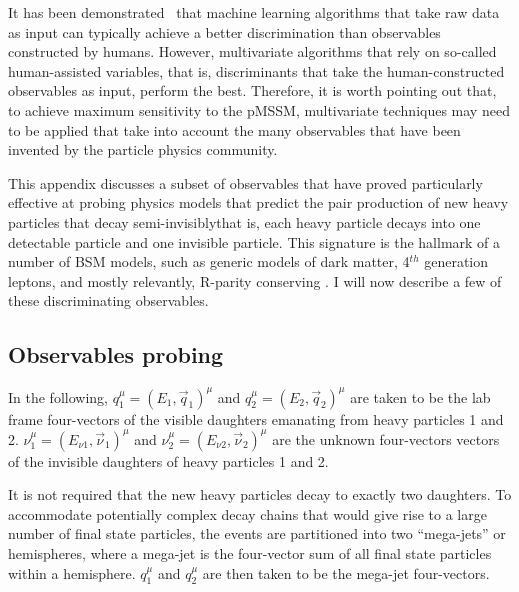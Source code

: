 It has been demonstrated~\cite{bishop2012pattern} that machine learning algorithms that take raw data as input can typically achieve a better discrimination than observables constructed by humans. However, multivariate algorithms that rely on so-called human-assisted variables, that is, discriminants that take the human-constructed observables as input, perform the best. Therefore, it is worth pointing out that, to achieve maximum sensitivity to the pMSSM, multivariate techniques may need to be applied that take into account the many observables that have been invented by the particle physics community. 

This appendix discusses a subset of observables that have proved particularly effective at probing physics models that predict the pair production of new heavy particles that decay semi-invisibly\textemdash that is, each heavy particle decays into one detectable particle and one invisible particle. This signature is the hallmark of a number of BSM models, such as generic models of dark matter, 4$^{th}$ generation leptons, and mostly relevantly, R-parity conserving \SUSY. I will now describe a few of these discriminating observables.

\subsection{Observables probing \SUSY}

In the following, $q_1 ^\mu=(E_1, \vec{q}_1)^\mu$ and $q_2 ^\mu=(E_2, \vec{q}_2) ^\mu$ are taken to be the lab frame four-vectors of the visible daughters emanating from heavy particles 1 and 2. $\nu_1 ^\mu=(E_{\nu1}, \vec{\nu}_1)^\mu$ and $\nu_2 ^\mu=(E_{\nu2}, \vec{\nu}_2) ^\mu$ are the unknown four-vectors vectors of the invisible daughters of heavy particles 1 and 2. 

It is not required that the new heavy particles decay to exactly two daughters. To accommodate potentially complex decay chains that would give rise to a large number of final state particles, the events are partitioned into two ``mega-jets''\cite{Aad:2012naa} or hemispheres, where a mega-jet is the four-vector sum of all final state particles within a hemisphere. $q_1 ^\mu$ and $q_2 ^\mu$ are then taken to be the mega-jet four-vectors. 


